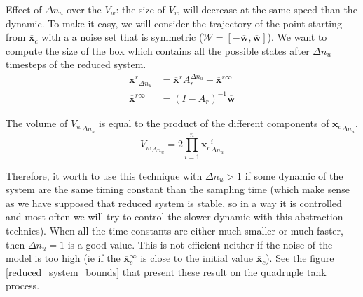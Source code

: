 \documentclass{article}
\theoremstyle{named}
\begin{document}
Effect of $\Delta n_u$ over the $V_w$: the size of $V_w$ will decrease at the same speed than the dynamic. To make it easy, we will consider the trajectory of the point starting from $\overline{\mathbf{x}}_c$ with a a noise set that is symmetric ($\mathcal{W} = \left [ -\overline{\mathbf{w}},\overline{\mathbf{w}} \right ]$). We want to compute the size of the box which contains all the possible states after $\Delta n_u$ timesteps of the reduced system.
\begin{equation}
\begin{split}
{\mathbf{x}^r}_{\Delta n_u} &= \overline{\mathbf{x}}^r A_r^{\Delta n_u} + \overline{\mathbf{x}}^{r \infty}\\
\overline{\mathbf{x}}^{r \infty} &= (I-A_r)^{-1}\overline{\mathbf{w}}
\end{split}
\end{equation}

The volume of ${V_w}_{\Delta n_u}$ is equal to the product of the different components of ${\mathbf{x}_c}_{\Delta n_u}$.
\begin{equation}
{V_w}_{\Delta n_u} = 2 \prod_{i=1}^n
{\mathbf{x}_c}_{\Delta n_u}^i
\end{equation}

Therefore, it worth to use this technique with $\Delta n_u>1$ if some dynamic of the system are the same timing constant than the sampling time (which make sense as we have supposed that reduced system is stable, so in a way it is controlled and most often we will try to control the slower dynamic with this abstraction technics). When all the time constants are either much smaller or much faster, then $\Delta n_u = 1$ is a good value.
This is not efficient neither if the noise of the model is too high (ie if the $\overline{\mathbf{x}}_c^{\infty}$ is close to the initial value $\overline{\mathbf{x}}_c$). See the figure \ref{reduced_system_bounds} that present these result on the quadruple tank process.
\end{document}
